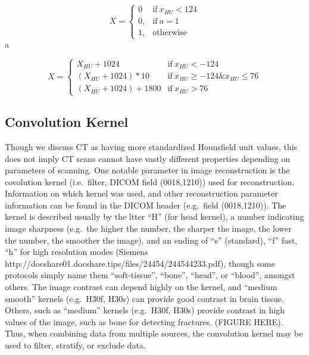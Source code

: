 \documentclass[]{elsarticle} %
\begin{document}
\begin{equation}
    X=
    \begin{cases}
      0 & \text{if}\ x_{HU} < 124 \\
      0, & \text{if}\ a=1 \\
      1, & \text{otherwise}
    \end{cases}
  \end{equation}a

\begin{equation}
    X=
    \begin{cases}
      X_{HU} + 1024 & \text{if}\ x_{HU} < -124 \\
      (X_{HU} + 1024) * 10 & \text{if}\ x_{HU} \geq -124 \& x_{HU} \leq 76 \\
      (X_{HU} + 1024) + 1800 & \text{if}\ x_{HU} > 76
    \end{cases}
  \end{equation}

\hypertarget{convolution-kernel}{%
\subsection{Convolution Kernel}\label{convolution-kernel}}

Though we discuss CT as having more standardized Hounsfield unit values,
this does not imply CT scans cannot have vastly different properties
depending on parameters of scanning. One notable parameter in image
reconstruction is the covolution kernel (i.e.~filter, DICOM field
(0018,1210)) used for reconstruction. Information on which kernel was
used, and other reconstruction parameter information can be found in the
DICOM header (e.g.~field (0018,1210)). The kernel is described usually
by the ltter ``H'' (for head kernel), a number indicating image
sharpness (e.g.~the higher the number, the sharper the image, the lower
the number, the smoother the image), and an ending of ``s'' (standard),
``f'' fast, ``h'' for high resolution modes (Siemens
http://docshare01.docshare.tips/files/24454/244544233.pdf), though some
protocols simply name them ``soft-tissue'', ``bone'', ``head'', or
``blood'', amongst others. The image contrast can depend highly on the
kernel, and ``medium smooth'' kernels (e.g.~H30f, H30s) can provide good
contrast in brain tissue. Others, such as ``medium'' kernels (e.g.~H30f,
H30s) provide contrast in high values of the image, such as bone for
detecting fractures. (FIGURE HERE). Thus, when combining data from
multiple sources, the convolution kernel may be used to filter,
stratify, or exclude data.
\end{document}
